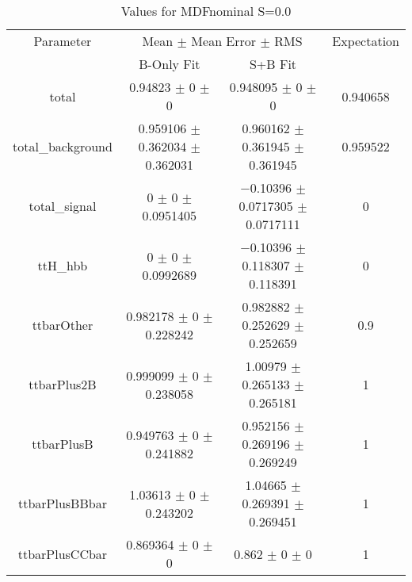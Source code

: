 \begin{table}
\centering
\caption{Values for MDFnominal S=0.0}
\begin{tabular}{cccc}
\toprule
Parameter & \multicolumn{2}{c}{Mean $\pm$ Mean Error $\pm$ RMS} & Expectation\\
 & B-Only Fit & S+B Fit & \\
\midrule
total & \num{0.94823} $\pm$ \num{0} $\pm$ \num{0} & \num{0.948095} $\pm$ \num{0} $\pm$ \num{0} & \num{0.940658}\\
total\_background & \num{0.959106} $\pm$ \num{0.362034} $\pm$ \num{0.362031} & \num{0.960162} $\pm$ \num{0.361945} $\pm$ \num{0.361945} & \num{0.959522}\\
total\_signal & \num{0} $\pm$ \num{0} $\pm$ \num{0.0951405} & \num{-0.10396} $\pm$ \num{0.0717305} $\pm$ \num{0.0717111} & \num{0}\\
ttH\_hbb & \num{0} $\pm$ \num{0} $\pm$ \num{0.0992689} & \num{-0.10396} $\pm$ \num{0.118307} $\pm$ \num{0.118391} & \num{0}\\
ttbarOther & \num{0.982178} $\pm$ \num{0} $\pm$ \num{0.228242} & \num{0.982882} $\pm$ \num{0.252629} $\pm$ \num{0.252659} & \num{0.9}\\
ttbarPlus2B & \num{0.999099} $\pm$ \num{0} $\pm$ \num{0.238058} & \num{1.00979} $\pm$ \num{0.265133} $\pm$ \num{0.265181} & \num{1}\\
ttbarPlusB & \num{0.949763} $\pm$ \num{0} $\pm$ \num{0.241882} & \num{0.952156} $\pm$ \num{0.269196} $\pm$ \num{0.269249} & \num{1}\\
ttbarPlusBBbar & \num{1.03613} $\pm$ \num{0} $\pm$ \num{0.243202} & \num{1.04665} $\pm$ \num{0.269391} $\pm$ \num{0.269451} & \num{1}\\
ttbarPlusCCbar & \num{0.869364} $\pm$ \num{0} $\pm$ \num{0} & \num{0.862} $\pm$ \num{0} $\pm$ \num{0} & \num{1}\\
\bottomrule
\end{tabular}
\end{table}